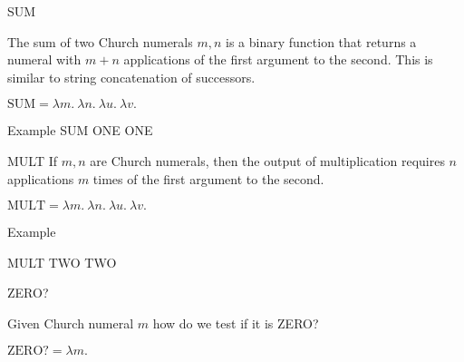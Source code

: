 \documentclass{beamer}
\begin{document}
\begin{frame}{SUM}

    The sum of two Church numerals $m,n$ is a binary function that returns a numeral with $m+n$ applications of the first argument to the second. This is similar to string concatenation of successors.
    
    \vspace{0.3cm}
    
    $\text{SUM} = \lambda m. \ \lambda n. \ \lambda u. \ \lambda v. \ $
    
    \vspace{6cm}

\end{frame}

\begin{frame}{Example}
    SUM ONE ONE
    
    \vspace{7cm} 
\end{frame}

\begin{frame}{MULT}
    If $m,n$ are Church numerals, then the output of multiplication requires $n$ applications $m$ times of the first argument to the second. 
    
    \vspace{0.3cm}
    
    $\text{MULT} = \lambda m. \ \lambda n. \ \lambda u. \ \lambda v. \ $
    
    \vspace{6cm}      
\end{frame}

\begin{frame}{Example}

    MULT TWO TWO
    
    \vspace{7cm}   
    
\end{frame}

\begin{frame}{ZERO?}
    
    Given Church numeral $m$ how do we test if it is ZERO?
    
    \vspace{0.3cm}
    
    $\text{ZERO?} = \lambda m.  \ $
    
    \vspace{6cm}  
    
\end{frame}
\end{document}
